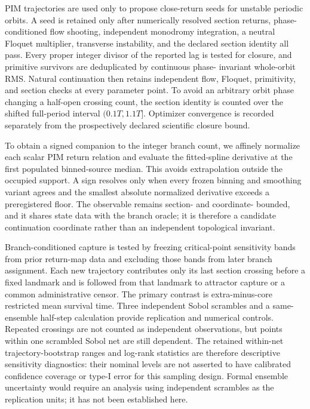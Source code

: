 PIM trajectories are used only to propose close-return seeds for unstable
periodic orbits.  A seed is retained only after numerically resolved section returns,
phase-conditioned flow shooting, independent monodromy integration, a neutral
Floquet multiplier, transverse instability, and the declared section identity
all pass.  Every proper integer divisor of the reported lag is tested for
closure, and primitive survivors are deduplicated by continuous phase-
invariant whole-orbit RMS.  Natural continuation then retains independent flow,
Floquet, primitivity, and section checks at every parameter point.  To avoid an
arbitrary orbit phase changing a half-open crossing count, the section identity
is counted over the shifted full-period interval $(0.1T,1.1T]$.  Optimizer
convergence is recorded separately from the prospectively declared scientific
closure bound.

To obtain a signed companion to the integer branch count, we affinely normalize
each scalar PIM return relation and evaluate the fitted-spline derivative at
the first populated binned-source median.  This avoids extrapolation outside
the occupied support.  A sign resolves only when every frozen binning and
smoothing variant agrees and the smallest absolute normalized derivative
exceeds a preregistered floor.  The observable remains section- and coordinate-
bounded, and it shares state data with the branch oracle; it is therefore a
candidate continuation coordinate rather than an independent topological
invariant.

Branch-conditioned capture is tested by freezing critical-point sensitivity
bands from prior return-map data and excluding those bands from later branch
assignment.  Each new trajectory contributes only its last section crossing
before a fixed landmark and is followed from that landmark to attractor capture
or a common administrative censor.  The primary contrast is extra-minus-core
restricted mean survival time. Three independent Sobol scrambles and a
same-ensemble half-step calculation provide replication and numerical controls.
Repeated crossings are not counted as independent observations, but points
within one scrambled Sobol net are still dependent. The retained within-net
trajectory-bootstrap ranges and log-rank statistics are therefore descriptive
sensitivity diagnostics: their nominal levels are not asserted to have
calibrated confidence coverage or type-I error for this sampling design.
Formal ensemble uncertainty would require an analysis using independent
scrambles as the replication units; it has not been established here.

